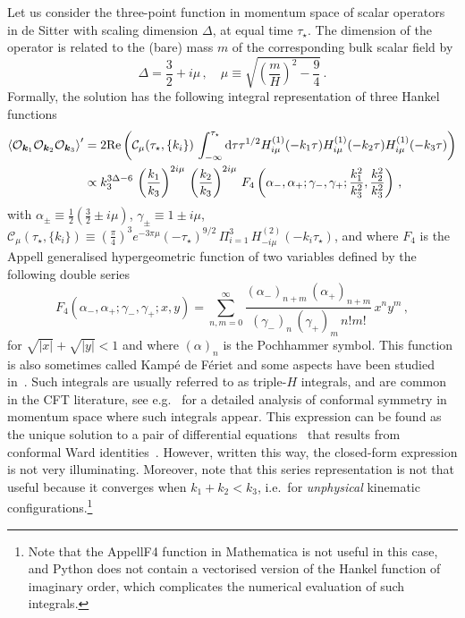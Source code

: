 \documentclass[11pt]{article}
\numberwithin{equation}{section} %
\def \d {\mathrm{d}}
\def \O {\mathcal{O}}
\begin{document}
\vskip 4pt
Let us consider the three-point function in momentum space of scalar operators in de Sitter with scaling dimension $\Delta$, at equal time $\tau_\star$. The dimension of the operator is related to the (bare) mass $m$ of the corresponding bulk scalar field by
\begin{equation}
    \Delta = \frac{3}{2} + i\mu\,, \quad \mu \equiv \sqrt{\left(\frac{m}{H}\right)^2 - \frac{9}{4}}\,.
\end{equation}
Formally, the solution has the following integral representation of three Hankel functions
\begin{equation}
    \begin{aligned}
    \braket{\O_{\bm{k}_1} \O_{\bm{k}_2} \O_{\bm{k}_3}}' &=  2\text{Re}\left(\mathcal{C}_\mu(\tau_\star, \{k_i\})\,\int_{-\infty}^{\tau_\star} \d \tau \tau^{1/2} H_{i\mu}^{(1)}(-k_1 \tau) H_{i\mu}^{(1)}(-k_2 \tau) H_{i\mu}^{(1)}(-k_3 \tau)\right) \\
    &\propto k_3^{3\Delta - 6}\, \left(\frac{k_1}{k_3}\right)^{2i\mu} \, \left(\frac{k_2}{k_3}\right)^{2i\mu} \, F_4\left(\alpha_-, \alpha_+; \gamma_-, \gamma_+; \frac{k_1^2}{k_3^2}, \frac{k_2^2}{k_3^2}\right) \,,
    \end{aligned}
\end{equation}
with $\alpha_\pm \equiv \tfrac{1}{2}(\tfrac{3}{2} \pm i\mu)$, $\gamma_\pm \equiv 1 \pm i\mu$, $\mathcal{C}_\mu(\tau_\star, \{k_i\}) \equiv \left(\tfrac{\pi}{4}\right)^3 e^{-3\pi\mu} (-\tau_\star)^{9/2} \,\Pi_{i=1}^3\, H_{-i\mu}^{(2)}(-k_i \tau_\star)$, and where $F_4$ is the Appell generalised hypergeometric function of two variables defined by the following double series
\begin{equation}
    F_4(\alpha_-, \alpha_+; \gamma_-, \gamma_+; x, y) = \sum_{n, m=0}^\infty \frac{(\alpha_-)_{n+m}\, (\alpha_+)_{n+m}}{(\gamma_-)_n\, (\gamma_+)_m\, n! m!}\, x^n y^m\,,
\end{equation}
for $\sqrt{|x|} + \sqrt{|y|} < 1$ and where $(\alpha)_n$ is the Pochhammer symbol. This function is also sometimes called Kampé de Fériet and some aspects have been studied in~\cite{Appell1926, Bateman1953}. Such integrals are usually referred to as triple-$H$ integrals, and are common in the CFT literature, see e.g.~\cite{Bzowski:2013sza} for a detailed analysis of conformal symmetry in momentum space where such integrals appear. This expression can be found as the unique solution to a pair of differential equations~\cite{Exton_1995, Prudnikov1992} that results from conformal Ward identities~\cite{Maldacena:2011nz, Creminelli:2012ed, Bzowski:2013sza}. However, written this way, the closed-form expression is not very illuminating. Moreover, note that this series representation is not that useful because it converges when $k_1 + k_2 < k_3$, i.e.~for \textit{unphysical} kinematic configurations.\footnote{Note that the \textsf{AppellF4} function in Mathematica is not useful in this case, and Python does not contain a vectorised version of the Hankel function of imaginary order, which complicates the numerical evaluation of such integrals.}
\end{document}
